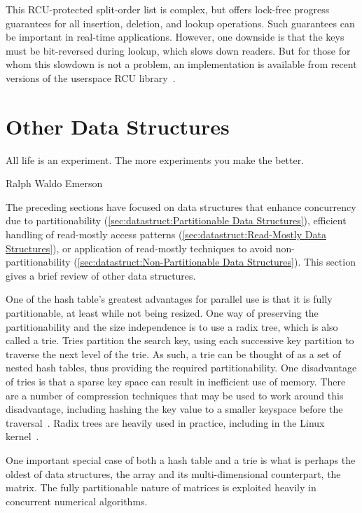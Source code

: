 This RCU-protected split-order list is complex, but offers lock-free
progress guarantees for all insertion, deletion, and lookup operations.
Such guarantees can be important in real-time applications.
However, one downside is that the keys must be bit-reversed during
lookup, which slows down readers.
But for those for whom this slowdown is not a problem, an
implementation is available from recent versions of the userspace RCU
library~\cite{MathieuDesnoyers2009URCU}.

\section{Other Data Structures}
\label{sec:datastruct:Other Data Structures}
%
\epigraph{All life is an experiment.
	  The more experiments you make the better.}
	 {Ralph Waldo Emerson}

The preceding sections have focused on data structures that enhance
concurrency due to partitionability
(\cref{sec:datastruct:Partitionable Data Structures}),
efficient handling of read-mostly access patterns
(\cref{sec:datastruct:Read-Mostly Data Structures}),
or application of read-mostly techniques to avoid
non-partitionability
(\cref{sec:datastruct:Non-Partitionable Data Structures}).
This section gives a brief review of other data structures.

One of the hash table's greatest advantages for parallel use is that it
is fully partitionable, at least while not being resized.
One way of preserving the partitionability and the size independence is
to use a radix tree, which is also called a trie.
Tries partition the search key, using each successive key partition
to traverse the next level of the trie.
As such, a trie can be thought of as a set of nested hash tables,
thus providing the required partitionability.
One disadvantage of tries is that a sparse key space can result in
inefficient use of memory.
There are a number of compression techniques that may be used to
work around this disadvantage, including hashing the key value to
a smaller keyspace before the
traversal~\cite{RobertOlsson2007Trash}.
Radix trees are heavily used in practice, including in the Linux
kernel~\cite{NickPiggin2006radixtree}.

One important special case of both a hash table and a trie is what is
perhaps the oldest of data structures, the array and its multi-dimensional
counterpart, the matrix.
The fully partitionable nature of matrices is exploited heavily in
concurrent numerical algorithms.

